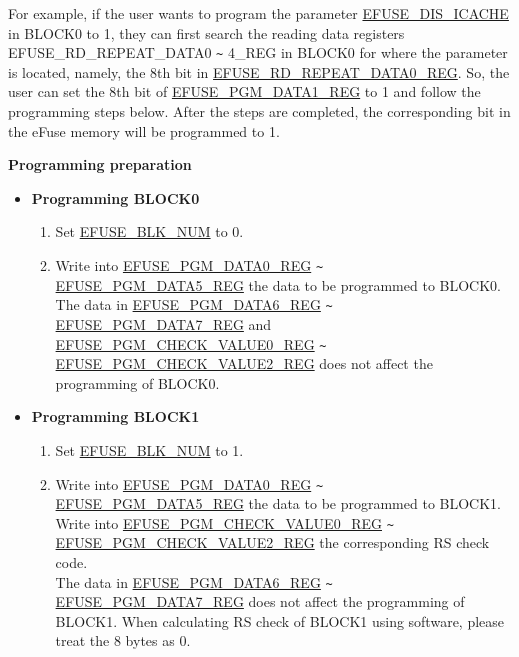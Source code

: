 \documentclass[main\_\_EN.tex]{subfiles}
\begin{document}
For example, if the user wants to program the parameter \hyperref[fielddesc:EFUSEDISICACHE]{EFUSE\_DIS\_ICACHE} in BLOCK0 to 1, they can first search the reading data registers EFUSE\_RD\_REPEAT\_DATA0 \verb+~+ 4\_REG in BLOCK0 for where the parameter is located, namely, the 8th bit in \hyperref[regdesc:EFUSERDREPEATDATA0REG]{EFUSE\_RD\_REPEAT\_DATA0\_REG}. So, the user can set the 8th bit of \hyperref[regdesc:EFUSEPGMDATA1REG]{EFUSE\_PGM\_DATA1\_REG}
to 1 and follow the programming steps below. After the steps are completed, the corresponding bit in the eFuse memory will be programmed to 1.

{\bfseries Programming preparation}

\begin{itemize}
    \item {\bfseries Programming BLOCK0}
    \begin{enumerate}
        \item Set \hyperref[fielddesc:EFUSEBLKNUM]{EFUSE\_BLK\_NUM} to 0.
        \item Write into \hyperref[regdesc:EFUSEPGMDATA0REG]{EFUSE\_PGM\_DATA0\_REG} \verb+~+ \hyperref[regdesc:EFUSEPGMDATA1REG]{EFUSE\_PGM\_DATA5\_REG} the data to be programmed to BLOCK0. \\
        The data in \hyperref[regdesc:EFUSEPGMDATA6REG]{EFUSE\_PGM\_DATA6\_REG} \verb+~+ \hyperref[regdesc:EFUSEPGMDATA7REG]{EFUSE\_PGM\_DATA7\_REG} and \hyperref[regdesc:EFUSEPGMCHECKVALUE0REG]{EFUSE\_PGM\_CHECK\_VALUE0\_REG} \verb+~+ \hyperref[regdesc:EFUSEPGMCHECKVALUE2REG]{EFUSE\_PGM\_CHECK\_VALUE2\_REG} does not affect the programming of BLOCK0.
    \end{enumerate}
    \item {\bfseries Programming BLOCK1}
    \begin{enumerate}
        \item Set \hyperref[fielddesc:EFUSEBLKNUM]{EFUSE\_BLK\_NUM} to 1.
        \item Write into \hyperref[regdesc:EFUSEPGMDATA0REG]{EFUSE\_PGM\_DATA0\_REG} \verb+~+ \hyperref[regdesc:EFUSEPGMDATA5REG]{EFUSE\_PGM\_DATA5\_REG} the data to be programmed to BLOCK1. Write into \hyperref[regdesc:EFUSEPGMCHECKVALUE0REG]{EFUSE\_PGM\_CHECK\_VALUE0\_REG} \verb+~+ \hyperref[regdesc:EFUSEPGMCHECKVALUE2REG]{EFUSE\_PGM\_CHECK\_VALUE2\_REG} the corresponding RS check code.\\
        The data in \hyperref[regdesc:EFUSEPGMDATA0REG]{EFUSE\_PGM\_DATA6\_REG} \verb+~+ \hyperref[regdesc:EFUSEPGMDATA5REG]{EFUSE\_PGM\_DATA7\_REG} does not affect the programming of BLOCK1. When calculating RS check of BLOCK1 using software, please treat the 8 bytes as 0.

\end{enumerate}
\end{itemize}
\end{document}
